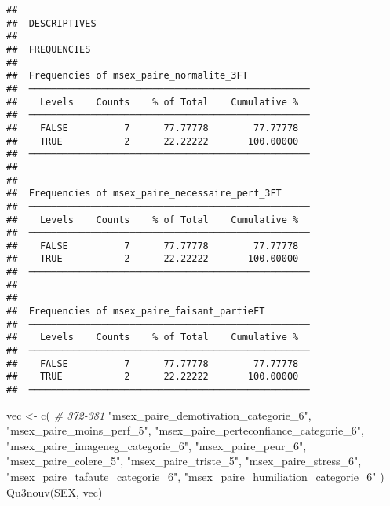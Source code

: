 \documentclass[
]{article}
\newenvironment{Shaded}{\begin{snugshade}}{\end{snugshade}}
\newcommand{\CommentTok}[1]{\textcolor[rgb]{0.56,0.35,0.01}{\textit{#1}}}
\newcommand{\FunctionTok}[1]{\textcolor[rgb]{0.00,0.00,0.00}{#1}}
\newcommand{\NormalTok}[1]{#1}
\newcommand{\OtherTok}[1]{\textcolor[rgb]{0.56,0.35,0.01}{#1}}
\newcommand{\StringTok}[1]{\textcolor[rgb]{0.31,0.60,0.02}{#1}}
\begin{document}
\begin{verbatim}
## 
##  DESCRIPTIVES
## 
##  FREQUENCIES
## 
##  Frequencies of msex_paire_normalite_3FT            
##  ────────────────────────────────────────────────── 
##    Levels    Counts    % of Total    Cumulative %   
##  ────────────────────────────────────────────────── 
##    FALSE          7      77.77778        77.77778   
##    TRUE           2      22.22222       100.00000   
##  ────────────────────────────────────────────────── 
## 
## 
##  Frequencies of msex_paire_necessaire_perf_3FT      
##  ────────────────────────────────────────────────── 
##    Levels    Counts    % of Total    Cumulative %   
##  ────────────────────────────────────────────────── 
##    FALSE          7      77.77778        77.77778   
##    TRUE           2      22.22222       100.00000   
##  ────────────────────────────────────────────────── 
## 
## 
##  Frequencies of msex_paire_faisant_partieFT         
##  ────────────────────────────────────────────────── 
##    Levels    Counts    % of Total    Cumulative %   
##  ────────────────────────────────────────────────── 
##    FALSE          7      77.77778        77.77778   
##    TRUE           2      22.22222       100.00000   
##  ──────────────────────────────────────────────────
\end{verbatim}

\begin{Shaded}
\begin{Highlighting}[]
\NormalTok{vec }\OtherTok{\textless{}{-}} \FunctionTok{c}\NormalTok{(  }\CommentTok{\# 372{-}381}
  \StringTok{"msex\_paire\_demotivation\_categorie\_6"}\NormalTok{,}
  \StringTok{"msex\_paire\_moins\_perf\_5"}\NormalTok{,}
  \StringTok{"msex\_paire\_perteconfiance\_categorie\_6"}\NormalTok{,}
  \StringTok{"msex\_paire\_imageneg\_categorie\_6"}\NormalTok{,}
  \StringTok{"msex\_paire\_peur\_6"}\NormalTok{,}
  \StringTok{"msex\_paire\_colere\_5"}\NormalTok{,}
  \StringTok{"msex\_paire\_triste\_5"}\NormalTok{,}
  \StringTok{"msex\_paire\_stress\_6"}\NormalTok{,}
  \StringTok{"msex\_paire\_tafaute\_categorie\_6"}\NormalTok{,}
  \StringTok{"msex\_paire\_humiliation\_categorie\_6"}
\NormalTok{  )}
\FunctionTok{Qu3nouv}\NormalTok{(SEX, vec)}
\end{Highlighting}
\end{Shaded}
\end{document}
